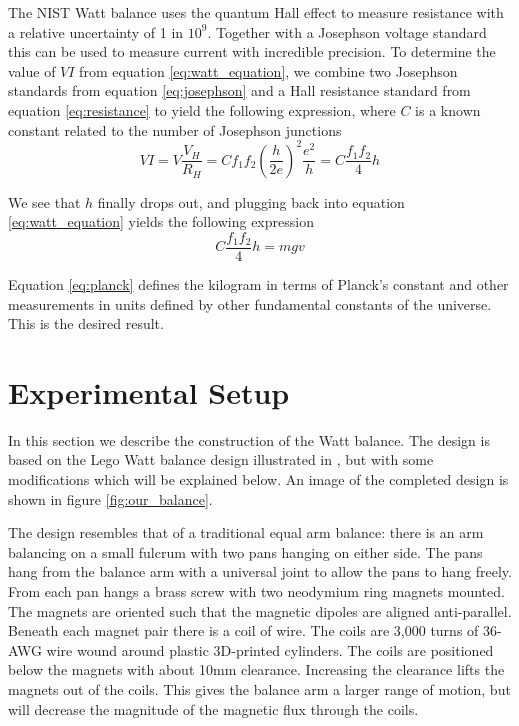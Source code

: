 \documentclass[aps,prstab,reprint,12pt]{revtex4-1}
\begin{document}
The NIST Watt balance uses the quantum Hall effect to measure resistance with a relative uncertainty of 1 in $10^9$. Together with a Josephson voltage standard this can be used to measure current with incredible precision. To determine the value of $VI$ from equation \ref{eq:watt_equation}, we combine two Josephson standards from equation \ref{eq:josephson} and a Hall resistance standard from equation \ref{eq:resistance} to yield the following expression, where $C$ is a known constant related to the number of Josephson junctions
\begin{equation}
    VI=V \frac{V_H}{R_H} = C f_1 f_2 \left(\frac{h}{2e}\right)^2 \frac{e^2}{h}=C \frac{f_1f_2}{4} h
\end{equation}

We see that $h$ finally drops out, and plugging back into equation \ref{eq:watt_equation} yields the following expression
\begin{equation}\label{eq:planck}
    C \frac{f_1f_2}{4} h = mgv
\end{equation}

Equation \ref{eq:planck} defines the kilogram in terms of Planck's constant and other measurements in units defined by other fundamental constants of the universe. This is the desired result.





\section{Experimental Setup}

In this section we describe the construction of the Watt balance. The design is based on the Lego Watt balance design illustrated in \cite{Chao2015}, but with some modifications which will be explained below. An image of the completed design is shown in figure \ref{fig:our_balance}.

The design resembles that of a traditional equal arm balance: there is an arm balancing on a small fulcrum with two pans hanging on either side. The pans hang from the balance arm with a universal joint to allow the pans to hang freely. From each pan hangs a brass screw with two neodymium ring magnets mounted. The magnets are oriented such that the magnetic dipoles are aligned anti-parallel. Beneath each magnet pair there is a coil of wire. The coils are 3,000 turns of 36-AWG wire wound around plastic 3D-printed cylinders. The coils are positioned below the magnets with about 10\si{mm} clearance. Increasing the clearance lifts the magnets out of the coils. This gives the balance arm a larger range of motion, but will decrease the magnitude of the magnetic flux through the coils.
\end{document}
